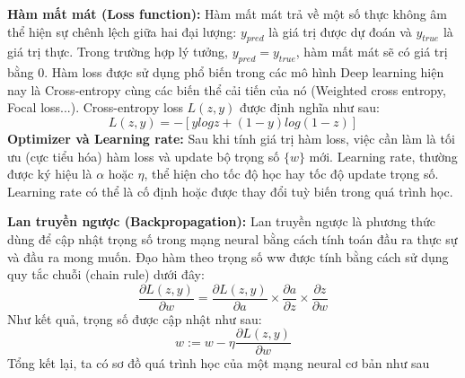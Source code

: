 \documentclass[a4paper, 12pt]{report}
\begin{document}

\textbf{Hàm mất mát (Loss function):} Hàm mất mát trả về một số thực không âm thể hiện sự chênh lệch giữa hai đại lượng: $y_{pred}$ là giá trị được dự đoán và $y_{true}$ là giá trị thực. Trong trường hợp lý tưởng, $y_{pred} = y_{true}$, hàm mất mát sẽ có giá trị bằng $0$. Hàm loss được sử dụng phổ biến trong các mô hình Deep learning hiện nay là Cross-entropy cùng các biến thể cải tiến của nó (Weighted cross entropy, Focal loss...). Cross-entropy loss $L(z, y)$ được định nghĩa như sau:
$$ L(z, y) = - [ylog{z} + (1-y)log(1-z)]$$ 
\textbf{Optimizer và Learning rate:} Sau khi tính giá trị hàm loss, việc cần làm là tối ưu (cực tiểu hóa) hàm loss và update bộ trọng số $\{w\}$ mới. Learning rate, thường được ký hiệu là $\alpha$ hoặc $\eta$, thể hiện cho tốc độ học hay tốc độ update trọng số. Learning rate có thể là cố định hoặc được thay đổi tuỳ biến trong quá trình học. \par 
\textbf{Lan truyền ngược (Backpropagation):} Lan truyền ngược là phương thức dùng để cập nhật trọng số trong mạng neural bằng cách tính toán đầu ra thực sự và đầu ra mong muốn. Đạo hàm theo trọng số ww được tính bằng cách sử dụng quy tắc chuỗi (chain rule) dưới đây:
$$ \frac{\partial L(z, y)}{\partial w} = \frac{\partial L(z, y)}{\partial a} \times \frac{\partial a}{\partial z} \times \frac{\partial z}{\partial w} $$ 
Như kết quả, trọng số được cập nhật như sau:
$$ w := w - \eta\frac{\partial L(z, y)}{\partial w} $$ 
Tổng kết lại, ta có sơ đồ quá trình học của một mạng neural cơ bản như sau\par
\end{document}

